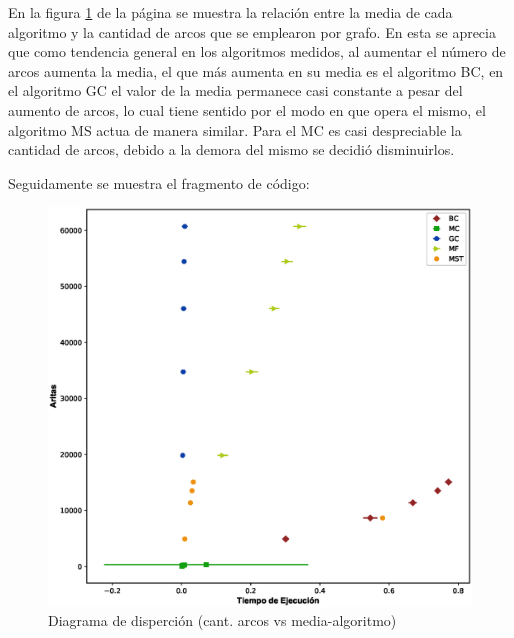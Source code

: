 \documentclass{article}
\begin{document}
En la figura \ref{fig:Fig3} de la página \pageref{fig:Fig3} se muestra la relación entre la media de cada algoritmo y la cantidad de arcos que se emplearon por grafo. En esta se aprecia que como tendencia general en los algoritmos medidos, al aumentar el número de arcos aumenta la media, el que más aumenta en su media es el algoritmo BC, en el algoritmo GC el valor de la media permanece casi constante a pesar del aumento de arcos, lo cual tiene sentido por el modo en que opera el mismo, el algoritmo MS actua de manera similar. Para el MC es casi despreciable la cantidad de arcos, debido a la demora del mismo se decidió disminuirlos.

Seguidamente se muestra el fragmento de código:


\newpage
\begin{figure}[htbp]
    \centering
    \includegraphics[scale=0.6]{Imagenes/Fig3.eps}
    \caption{Diagrama de disperción (cant. arcos vs media-algoritmo)}
    \label{fig:Fig3}
\end{figure}
    
\newpage


\end{document}
